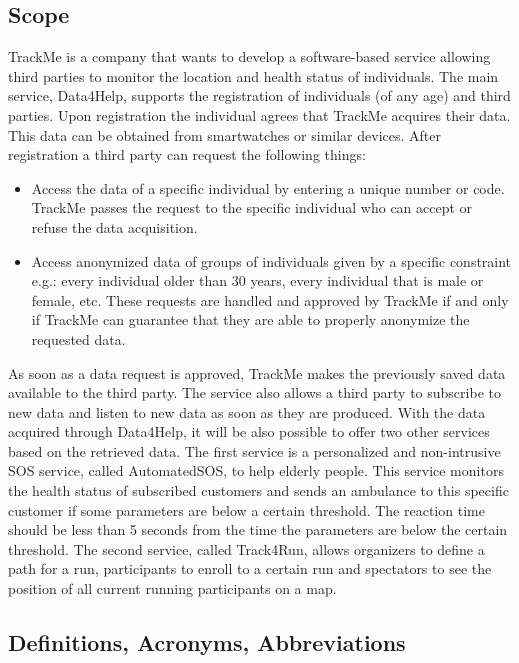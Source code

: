 \documentclass[12pt]{article}
\begin{document}
\subsection{Scope}
TrackMe is a company that wants to develop a software-based service allowing third parties to monitor the location and health status of individuals. The main service, Data4Help, supports the registration of individuals (of any age) and third parties. Upon registration the individual agrees that TrackMe acquires their data. This data can be obtained from smartwatches or similar devices. After registration a third party can request the following things:
\begin{itemize}
\item Access the data of a specific individual by entering a unique number or code. TrackMe passes the request to the specific individual who can accept or refuse the data acquisition.
\item Access anonymized data of groups of individuals given by a specific constraint e.g.: every individual older than 30 years, every individual that is male or female, etc. These requests are handled and approved by TrackMe if and only if TrackMe can guarantee that they are able to properly anonymize the requested data.
\end{itemize}
As soon as a data request is approved, TrackMe makes the previously saved data available to the third party. The service also allows a third party to subscribe to new data and listen to new data as soon as they are produced. With the data acquired through Data4Help, it will be also possible to offer two other services based on the retrieved data. The first service is a personalized and non-intrusive SOS service, called AutomatedSOS, to help elderly people. This service monitors the health status of subscribed customers and sends an ambulance to this specific customer if some parameters are below a certain threshold. The reaction time should be less than 5 seconds from the time the parameters are below the certain threshold.
The second service, called Track4Run, allows organizers to define a path for a run, participants to enroll to a certain run and spectators to see the position of all current running participants on a map.

\subsection{Definitions, Acronyms, Abbreviations}
\end{document}
